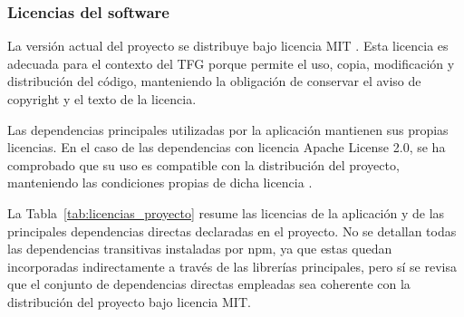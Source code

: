 \subsubsection{Licencias del software}

La versión actual del proyecto se distribuye bajo licencia MIT \cite{mit-license}. Esta licencia es adecuada para el contexto del TFG porque permite el uso, copia, modificación y distribución del código, manteniendo la obligación de conservar el aviso de copyright y el texto de la licencia.

Las dependencias principales utilizadas por la aplicación mantienen sus propias licencias. En el caso de las dependencias con licencia Apache License 2.0, se ha comprobado que su uso es compatible con la distribución del proyecto, manteniendo las condiciones propias de dicha licencia \cite{apache-license}.

La Tabla~\ref{tab:licencias_proyecto} resume las licencias de la aplicación y de las principales dependencias directas declaradas en el proyecto. No se detallan todas las dependencias transitivas instaladas por npm, ya que estas quedan incorporadas indirectamente a través de las librerías principales, pero sí se revisa que el conjunto de dependencias directas empleadas sea coherente con la distribución del proyecto bajo licencia MIT.

